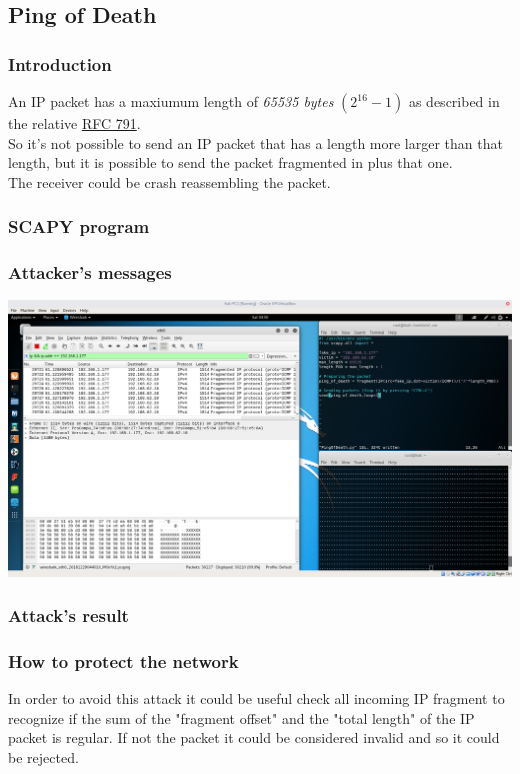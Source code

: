 \subsection{Ping of Death}
\subsubsection{Introduction}
An IP packet has a maxiumum length of \textit{65535 bytes} $(2^{16}-1)$ as described in the relative \href{https://tools.ietf.org/html/rfc791}{RFC 791}.\\
So it's not possible to send an IP packet that has a length more larger than that length, but it is possible to send the packet fragmented in plus that one.\\
The receiver could be crash reassembling the packet.\par

\subsubsection{SCAPY program}


\subsubsection{Attacker's messages}
\includegraphics[width=16cm]{img/PingOfDeath.png}

\subsubsection{Attack's result}


\subsubsection{How to protect the network}
In order to avoid this attack it could be useful check all incoming IP fragment to recognize if the sum of the "fragment offset" and the "total length" of the IP packet is regular. If not the packet it could be considered invalid and so it could be rejected.\par

